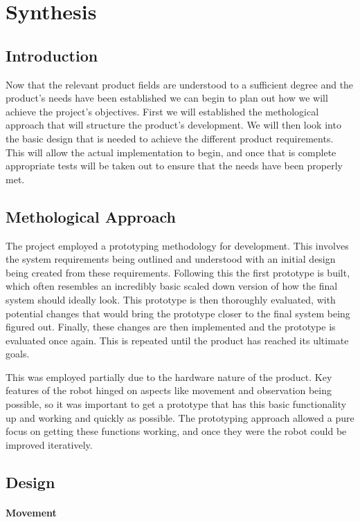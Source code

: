 \part{Synthesis}
	\chapter{Introduction}
	Now that the relevant product fields are understood to a sufficient degree and the product's needs have been established we can begin to plan out how we will achieve the project's objectives. First we will established the methological approach that will structure the product's development. We will then look into the basic design that is needed to achieve the different product requirements. This will allow the actual implementation to begin, and once that is complete appropriate tests will be taken out to ensure that the needs have been properly met.
	
	\chapter{Methological Approach}
	The project employed a prototyping methodology for development. This involves the system requirements being outlined and understood with an initial design being created from these requirements. Following this the first prototype is built, which often resembles an incredibly basic scaled down version of how the final system should ideally look. This prototype is then thoroughly evaluated, with potential changes that would bring the prototype closer to the final system being figured out. Finally, these changes are then implemented and the prototype is evaluated once again. This is repeated until the product has reached its ultimate goals.
	
	
	This was employed partially due to the hardware nature of the product. Key features of the robot hinged on aspects like movement and observation being possible, so it was important to get a prototype that has this basic functionality up and working and quickly as possible. The prototyping approach allowed a pure focus on getting these functions working, and once they were the robot could be improved iteratively.
	
	\chapter{Design}
		\subsection{Movement}
